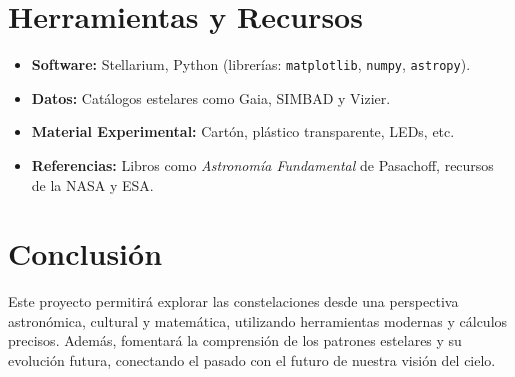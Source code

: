 \documentclass[12pt]{article}
\begin{document}
\section*{Herramientas y Recursos}
\begin{itemize}
    \item \textbf{Software:} Stellarium, Python (librer\'ias: \texttt{matplotlib}, \texttt{numpy}, \texttt{astropy}).
    \item \textbf{Datos:} Cat\'alogos estelares como Gaia, SIMBAD y Vizier.
    \item \textbf{Material Experimental:} Cart\'on, pl\'astico transparente, LEDs, etc.
    \item \textbf{Referencias:} Libros como \textit{Astronom\'ia Fundamental} de Pasachoff, recursos de la NASA y ESA.
\end{itemize}

\section*{Conclusi\'on}
Este proyecto permitir\'a explorar las constelaciones desde una perspectiva astron\'omica, cultural y matem\'atica, utilizando herramientas modernas y c\'alculos precisos. Adem\'as, fomentar\'a la comprensi\'on de los patrones estelares y su evoluci\'on futura, conectando el pasado con el futuro de nuestra visi\'on del cielo.
\end{document}
